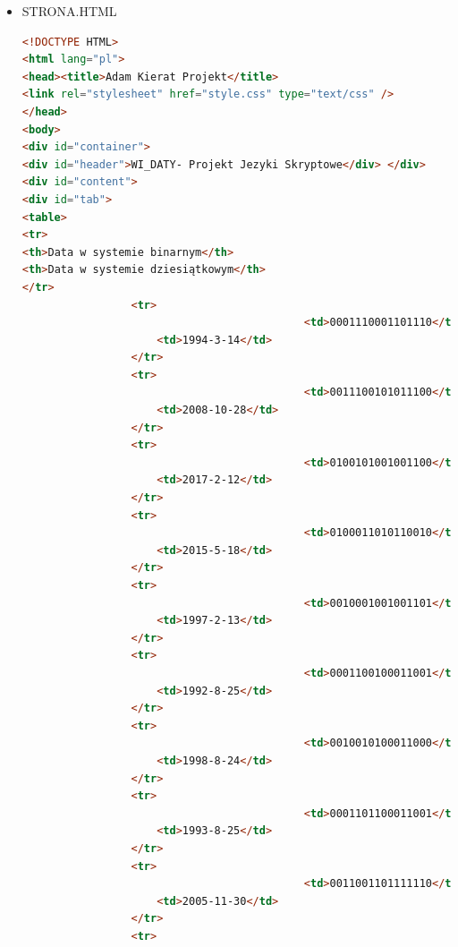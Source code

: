 \documentclass[12pt,a4paper]{article}
\begin{document}
\begin{itemize}
\begin{lstlisting}[language=Python]
for i, row in enumerate(infile2):
    if i in linijki:
        values_output.append(row.strip('\n'))

#for line1 in infile1:
#    values_input.append(line1.strip('\n'))

#plt.subplot(1, 2, 1)
plt.plot(values_output, values_input,'o-')
plt.title('Wykres dla 6 przykładów')
plt.gcf().subplots_adjust(left=0.28)
plt.ylabel('Data w postaci binarnej')
plt.xlabel('Data[rok-miesiac-dzien]')

plt.savefig('wykres.png')



	\end{lstlisting}
		\newpage
	\item STRONA.HTML
	\begin{lstlisting}[language=Html]
<!DOCTYPE HTML>
<html lang="pl">
<head><title>Adam Kierat Projekt</title>
<link rel="stylesheet" href="style.css" type="text/css" /> 
</head> 
<body> 
<div id="container"> 
<div id="header">WI_DATY- Projekt Jezyki Skryptowe</div> </div> 
<div id="content"> 
<div id="tab">
<table>
<tr>
<th>Data w systemie binarnym</th>
<th>Data w systemie dziesiątkowym</th>
</tr>
                 <tr>
                                            <td>0001110001101110</td>
                     <td>1994-3-14</td> 
                 </tr>
                 <tr>
                                            <td>0011100101011100</td>
                     <td>2008-10-28</td> 
                 </tr>
                 <tr>
                                            <td>0100101001001100</td>
                     <td>2017-2-12</td> 
                 </tr>
                 <tr>
                                            <td>0100011010110010</td>
                     <td>2015-5-18</td> 
                 </tr>
                 <tr>
                                            <td>0010001001001101</td>
                     <td>1997-2-13</td> 
                 </tr>
                 <tr>
                                            <td>0001100100011001</td>
                     <td>1992-8-25</td> 
                 </tr>
                 <tr>
                                            <td>0010010100011000</td>
                     <td>1998-8-24</td> 
                 </tr>
                 <tr>
                                            <td>0001101100011001</td>
                     <td>1993-8-25</td> 
                 </tr>
                 <tr>
                                            <td>0011001101111110</td>
                     <td>2005-11-30</td> 
                 </tr>
                 <tr>

\end{lstlisting}
\end{itemize}
\end{document}

